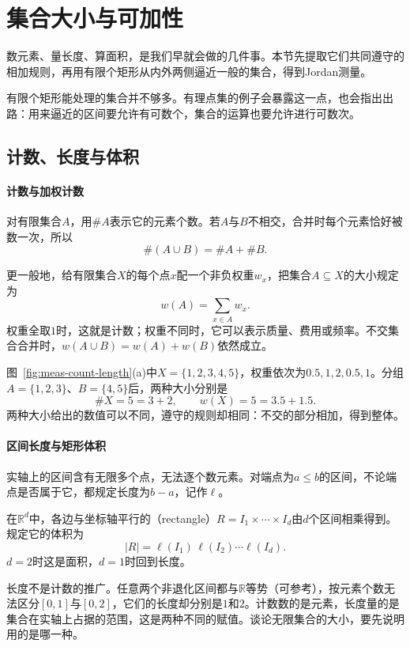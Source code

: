 \section{集合大小与可加性}
\label{sec:meas-size-additivity}

数元素、量长度、算面积，是我们早就会做的几件事。本节先提取它们共同遵守的相加规则，再用有限个矩形从内外两侧逼近一般的集合，得到Jordan测量。

有限个矩形能处理的集合并不够多。有理点集的例子会暴露这一点，也会指出出路：用来逼近的区间要允许有可数个，集合的运算也要允许进行可数次。

\subsection{计数、长度与体积}
\label{sec:meas-count-length-volume}

\paragraph{计数与加权计数}
对有限集合$A$，用$\#A$表示它的元素个数。若$A$与$B$不相交，合并时每个元素恰好被数一次，所以
\[
 \#(A\cup B)=\#A+\#B.
\]

更一般地，给有限集合$X$的每个点$x$配一个非负权重$w_x$，把集合$A\subseteq X$的大小规定为
\[
 w(A)=\sum_{x\in A}w_x.
\]
权重全取$1$时，这就是计数；权重不同时，它可以表示质量、费用或频率。不交集合合并时，$w(A\cup B)=w(A)+w(B)$依然成立。

图~\ref{fig:meas-count-length}(a)中$X=\{1,2,3,4,5\}$，权重依次为$0.5,1,2,0.5,1$。分组$A=\{1,2,3\}$、$B=\{4,5\}$后，两种大小分别是
\[
 \#X=5=3+2,\qquad w(X)=5=3.5+1.5.
\]
两种大小给出的数值可以不同，遵守的规则却相同：不交的部分相加，得到整体。

\paragraph{区间长度与矩形体积}
实轴上的区间含有无限多个点，无法逐个数元素。对端点为$a\leq b$的区间，不论端点是否属于它，都规定长度为$b-a$，记作$\ell$。

在$\mathbb R^d$中，各边与坐标轴平行的（rectangle）$R=I_1\times\cdots\times I_d$由$d$个区间相乘得到。规定它的体积为
\[
 \lvert R\rvert=\ell(I_1)\,\ell(I_2)\cdots\ell(I_d).
\]
$d=2$时这是面积，$d=1$时回到长度。

长度不是计数的推广。任意两个非退化区间都与$\mathbb R$等势（可参考），按元素个数无法区分$[0,1]$与$[0,2]$，它们的长度却分别是$1$和$2$。计数数的是元素，长度量的是集合在实轴上占据的范围，这是两种不同的赋值。谈论无限集合的大小，要先说明用的是哪一种。

